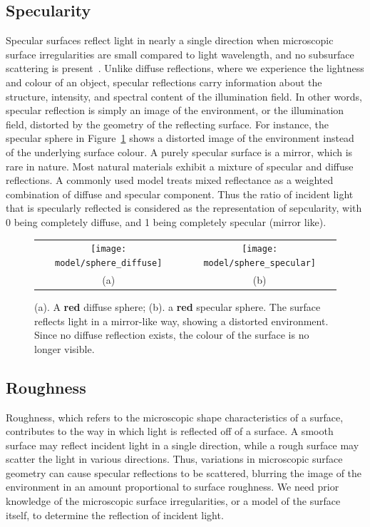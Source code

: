 \subsection{Specularity}
Specular surfaces reflect light in nearly a single direction when microscopic surface irregularities are small compared to light wavelength, and no subsurface scattering is present~\cite{nayar1989surface}. Unlike diffuse reflections, where we experience the lightness and colour of an object, specular reflections carry information about the structure, intensity, and spectral content of the illumination field. In other words, specular reflection is simply an image of the environment, or the illumination field, distorted by the geometry of the reflecting surface. For instance, the specular sphere in Figure~\ref{fig:spec_ref} shows a distorted image of the environment instead of the underlying surface colour. A purely specular surface is a mirror, which is rare in nature. Most natural materials exhibit a mixture of specular and diffuse reflections. A commonly used model treats mixed reflectance as a weighted combination of diffuse and specular component. Thus the ratio of incident light that is specularly reflected is considered as the representation of sepcularity, with 0 being completely diffuse, and 1 being completely specular (mirror like).
\begin{figure}[!htbp]
\centering
\begin{tabular}{cc}
\texttt{[image: model/sphere\_diffuse]}&
\texttt{[image: model/sphere\_specular]}\\
(a) & (b)\\
\end{tabular}
\caption{(a). A \textbf{red} diffuse sphere; (b). a \textbf{red} specular sphere. The surface reflects light in a mirror-like way, showing a distorted environment. Since no diffuse reflection exists, the colour of the surface is no longer visible.}
\label{fig:spec_ref}
\end{figure}

\subsection{Roughness}
Roughness, which refers to the microscopic shape characteristics of a surface, contributes to the way in which light is reflected off of a surface. A smooth surface may reflect incident light in a single direction, while a rough surface may scatter the light in various directions. Thus, variations in microscopic surface geometry can cause specular reflections to be scattered, blurring the image of the environment in an amount proportional to surface roughness. We need prior knowledge of the microscopic surface irregularities, or a model of the surface itself, to determine the reflection of incident light.

